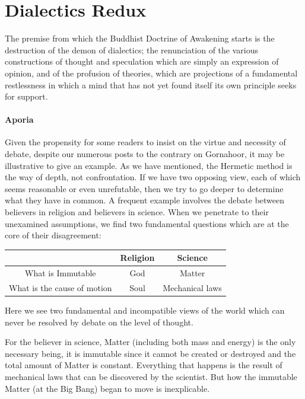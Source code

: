 \section{Dialectics Redux}

\begin{quotex}
The premise from which the Buddhist Doctrine of Awakening starts is the destruction of the demon of dialectics; the renunciation of the various constructions of thought and speculation which are simply an expression of opinion, and of the profusion of theories, which are projections of a fundamental restlessness in which a mind that has not yet found itself its own principle seeks for support.
\end{quotex}

\paragraph{Aporia}

Given the propensity for some readers to insist on the virtue and necessity of debate, despite our numerous posts to the contrary on Gornahoor, it may be illustrative to give an example. As we have mentioned, the Hermetic method is the way of depth, not confrontation. If we have two opposing view, each of which seems reasonable or even unrefutable, then we try to go deeper to determine what they have in common. A frequent example involves the debate between believers in religion and believers in science. When we penetrate to their unexamined assumptions, we find two fundamental questions which are at the core of their disagreement:

\begin{table}[h]\centering
\begin{tabular}{ccc}\toprule
~ & Religion & Science \\\midrule
What is Immutable & God & Matter \\
What is the cause of motion & Soul & Mechanical laws \\\bottomrule
\end{tabular}
\end{table}


Here we see two fundamental and incompatible views of the world which can never be resolved by debate on the level of thought.

For the believer in science, Matter (including both mass and energy) is the only necessary being, it is immutable since it cannot be created or destroyed and the total amount of Matter is constant. Everything that happens is the result of mechanical laws that can be discovered by the scientist. But how the immutable Matter (at the Big Bang) began to move is inexplicable.

